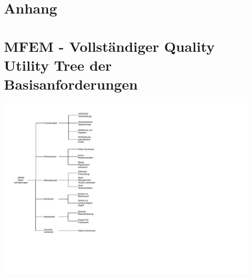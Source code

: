 \documentclass[12pt,a4paper,bibliography=totocnumbered,listof=totocnumbered]{scrartcl}
\numberwithin{figure}{section} %
\numberwithin{table}{section} %
\begin{document}
\begin{appendix}
\section*{Anhang}
{}
\section{\acs*{MFEM} - Vollständiger Quality Utility Tree der Basisanforderungen}
	\begin{minipage}{\linewidth}
	\centering
	\includegraphics[width=0.8\linewidth]{Bilder/Basisanforderungen-QUT.pdf}	
	\end{minipage}
\pagebreak

\end{appendix}
\end{document}
